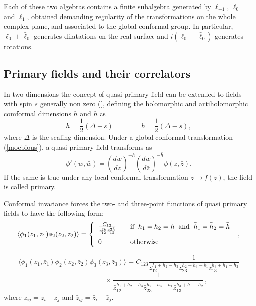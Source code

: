 \documentclass[a4paper,12pt]{report}
\begin{document}
Each of these two algebras contains a finite subalgebra generated by $\ell_{-1}$, $\ell_{0}$ and $\ell_{1}$,
obtained demanding regularity of the transformations on the whole complex plane, and associated to the global
conformal group. In particular, $\ell_{0}+\bar{\ell}_{0}$ generates dilatations on the real surface and
$i(\ell_{0}-\bar{\ell}_{0})$ generates rotations.

\subsection{Primary fields and their correlators}

In two dimensions the concept of quasi-primary field can be extended to fields with spin $s$ generally non zero
(\cite{bpz}), defining the holomorphic and antiholomorphic comformal dimensions $h$ and $\bar{h}$ as
\begin{equation}\label{h}
h=\frac{1}{2}(\Delta+s)\qquad\qquad \bar{h}=\frac{1}{2}(\Delta-s),
\end{equation}
where $\Delta$ is the scaling dimension. Under a global conformal transformation (\ref{moebious}), a
quasi-primary field transforms as
\begin{equation}
\phi'(w,\bar{w})=\left(\frac{dw}{dz}\right)^{-h}\left(\frac{d\bar{w}}{d\bar{z}}\right)^{-\bar{h}}\phi(z,\bar{z}).
\end{equation}
If the same is true under any local conformal transformation $z\rightarrow f(z)$, the field is called primary.

Conformal invariance forces the two- and three-point functions of quasi primary fields to have the following form:
\begin{equation}
\langle\phi_{1}(z_{1},\bar{z}_{1})\phi_{2}(z_{2},\bar{z}_{2})\rangle=\left\{
\begin{array}{ll}
\frac{C_{12}}{z_{12}^{2h}\bar{z}_{12}^{2\bar{h}}} &
\quad  \textrm{if}\;\;h_{1}=h_{2}=h \;\;\textrm{and}\;\;\bar{h}_{1}=\bar{h}_{2}=\bar{h}\medskip \\
0 & \quad \textrm{otherwise}\,\,\, \label{2pt}
\end{array}
\right. \,\, ,
\end{equation}

\begin{equation}\label{3pt}
\langle\phi_{1}(z_{1},\bar{z}_{1})\phi_{2}(z_{2},\bar{z}_{2})\phi_{3}(z_{3},\bar{z}_{3})\rangle=C_{123}\frac{1}{z_{12}^{h_{1}+h_{2}-h_{3}}z_{23}^{h_{2}+h_{3}-h_{1}}z_{13}^{h_{3}+h_{1}-h_{2}}}
\end{equation}
\begin{displaymath}
\qquad\qquad\qquad\qquad\times\frac{1}{\bar{z}_{12}^{\bar{h}_{1}+\bar{h}_{2}-\bar{h}_{3}}\bar{z}_{23}^{\bar{h}_{2}+\bar{h}_{3}-\bar{h}_{1}}\bar{z}_{13}^{\bar{h}_{3}+\bar{h}_{1}-\bar{h}_{2}}}\,,
\end{displaymath}
where $z_{ij}=z_{i}-z_{j}$ and $\bar{z}_{ij}=\bar{z}_{i}-\bar{z}_{j}$.
\end{document}
